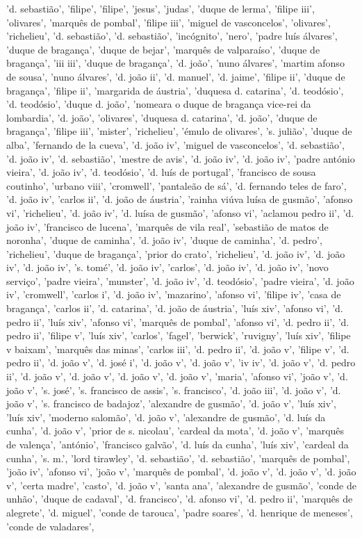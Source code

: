 \documentclass{article}
\begin{document}
\begin{itemize}
'd. sebastião', 'filipe', 'filipe', 'jesus', 'judas', 'duque de lerma', 'filipe iii', 'olivares', 'marquês de pombal', 'filipe iii', 'miguel de vasconcelos', 'olivares', 'richelieu', 'd. sebastião', 'd. sebastião', 'incógnito', 'nero', 'padre luís álvares', 'duque de bragança', 'duque de bejar', 'marquês de valparaíso', 'duque de bragança', 'iii iii', 'duque de bragança', 'd. joão', 'nuno álvares', 'martim afonso de sousa', 'nuno álvares', 'd. joão ii', 'd. manuel', 'd. jaime', 'filipe ii', 'duque de bragança', 'filipe ii', 'margarida de áustria', 'duquesa d. catarina', 'd. teodósio', 'd. teodósio', 'duque d. joão', 'nomeara o duque de bragança vice-rei da lombardia', 'd. joão', 'olivares', 'duquesa d. catarina', 'd. joão', 'duque de bragança', 'filipe iii', 'mister', 'richelieu', 'émulo de olivares', 's. julião', 'duque de alba', 'fernando de la cueva', 'd. joão iv', 'miguel de vasconcelos', 'd. sebastião', 'd. joão iv', 'd. sebastião', 'mestre de avis', 'd. joão iv', 'd. joão iv', 'padre antónio vieira', 'd. joão iv', 'd. teodósio', 'd. luís de portugal', 'francisco de sousa coutinho', 'urbano viii', 'cromwell', 'pantaleão de sá', 'd. fernando teles de faro', 'd. joão iv', 'carlos ii', 'd. joão de áustria', 'rainha viúva luísa de gusmão', 'afonso vi', 'richelieu', 'd. joão iv', 'd. luísa de gusmão', 'afonso vi', 'aclamou pedro ii', 'd. joão iv', 'francisco de lucena', 'marquês de vila real', 'sebastião de matos de noronha', 'duque de caminha', 'd. joão iv', 'duque de caminha', 'd. pedro', 'richelieu', 'duque de bragança', 'prior do crato', 'richelieu', 'd. joão iv', 'd. joão iv', 'd. joão iv', 's. tomé', 'd. joão iv', 'carlos', 'd. joão iv', 'd. joão iv', 'novo serviço', 'padre vieira', 'munster', 'd. joão iv', 'd. teodósio', 'padre vieira', 'd. joão iv', 'cromwell', 'carlos i', 'd. joão iv', 'mazarino', 'afonso vi', 'filipe iv', 'casa de bragança', 'carlos ii', 'd. catarina', 'd. joão de áustria', 'luís xiv', 'afonso vi', 'd. pedro ii', 'luís xiv', 'afonso vi', 'marquês de pombal', 'afonso vi', 'd. pedro ii', 'd. pedro ii', 'filipe v', 'luís xiv', 'carlos', 'fagel', 'berwick', 'ruvigny', 'luís xiv', 'filipe v baixam', 'marquês das minas', 'carlos iii', 'd. pedro ii', 'd. joão v', 'filipe v', 'd. pedro ii', 'd. joão v', 'd. josé i', 'd. joão v', 'd. joão v', 'iv iv', 'd. joão v', 'd. pedro ii', 'd. joão v', 'd. joão v', 'd. joão v', 'd. joão v', 'maria', 'afonso vi', 'joão v', 'd. joão v', 's. josé', 's. francisco de assis', 's. francisco', 'd. joão iii', 'd. joão v', 'd. joão v', 's. francisco de badajoz', 'alexandre de gusmão', 'd. joão v', 'luís xiv', 'luís xiv', 'moderno salomão', 'd. joão v', 'alexandre de gusmão', 'd. luís da cunha', 'd. joão v', 'prior de s. nicolau', 'cardeal da mota', 'd. joão v', 'marquês de valença', 'antónio', 'francisco galvão', 'd. luís da cunha', 'luís xiv', 'cardeal da cunha', 's. m.', 'lord tirawley', 'd. sebastião', 'd. sebastião', 'marquês de pombal', 'joão iv', 'afonso vi', 'joão v', 'marquês de pombal', 'd. joão v', 'd. joão v', 'd. joão v', 'certa madre', 'casto', 'd. joão v', 'santa ana', 'alexandre de gusmão', 'conde de unhão', 'duque de cadaval', 'd. francisco', 'd. afonso vi', 'd. pedro ii', 'marquês de alegrete', 'd. miguel', 'conde de tarouca', 'padre soares', 'd. henrique de meneses', 'conde de valadares', 
\end{itemize}
\end{document}
